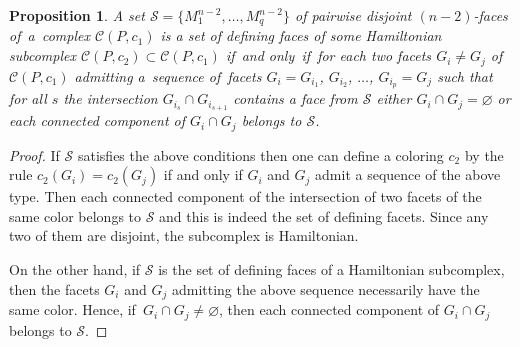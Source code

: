 \documentclass[12pt]{amsart}
\newtheorem{proposition}[formula]{Proposition}
\theoremstyle{definition}
\theoremstyle{remark}
\begin{document}
\begin{proposition}\label{prop:critdef}
A set $\mathcal{S}=\{M_1^{n-2},\dots, M_q^{n-2}\}$ of pairwise disjoint $(n-2)$-faces of~a~complex $\mathcal{C}(P,c_1)$ is a set
of defining faces of some Hamiltonian subcomplex $\mathcal{C}(P,c_2)\subset \mathcal{C}(P,c_1)$ if~and only~if~for each 
two facets $G_i\ne G_j$ of~$\mathcal{C}(P,c_1)$ admitting  a~sequence 
of~facets $G_i=G_{i_1}$, $G_{i_2}$, $\dots$, $G_{i_p}=G_j$ such that for all $s$ the
intersection $G_{i_s}\cap G_{i_{s+1}}$ contains a face from $\mathcal{S}$ either $G_i\cap G_j=\varnothing$ or 
each connected component of $G_i\cap G_j$ belongs to $\mathcal{S}$. 
\end{proposition}
\begin{proof}
If $\mathcal{S}$ satisfies the above conditions then one can define a coloring $c_2$ by the 
rule $c_2(G_i)=c_2(G_j)$ if and only if  $G_i$ and $G_j$ admit a sequence of the above type. Then
each connected component of the intersection of two facets of the same color belongs to $\mathcal{S}$ and 
this is indeed the set of defining facets. Since any two of them are disjoint, the subcomplex is Hamiltonian.

On the other hand, if $\mathcal{S}$ is the set of defining faces of a Hamiltonian subcomplex, 
then the facets $G_i$ and $G_j$ admitting the 
above sequence necessarily have the same color. Hence, if~$G_i\cap G_j\ne\varnothing$, 
then each connected component of $G_i\cap G_j$ belongs to $\mathcal{S}$.
\end{proof}
\end{document}
